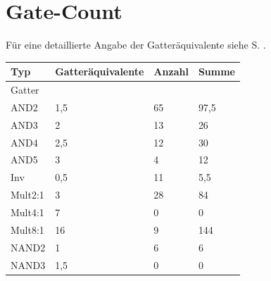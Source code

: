 \documentclass[11pt]{report}
\begin{document}
	\section{Gate-Count}
	Für eine detaillierte Angabe der Gatteräquivalente siehe S. \pageref{gatecounttable}.
	\begin{table}[]
		\centering
		\label{gatecounttable}
		\begin{tabular}{llll}
			\hline
			Typ                                          & Gatteräquivalente          & Anzahl                  & Summe                      \\ \hline\hline
			\multicolumn{1}{|l}{Gatter}                  &                            &                         & \multicolumn{1}{l|}{}      \\ \hline
			\multicolumn{1}{|l|}{AND2}                   & \multicolumn{1}{l|}{1,5}   & \multicolumn{1}{l|}{65} & \multicolumn{1}{l|}{97,5}  \\ \hline
			\multicolumn{1}{|l|}{AND3}                   & \multicolumn{1}{l|}{2}     & \multicolumn{1}{l|}{13} & \multicolumn{1}{l|}{26}    \\ \hline
			\multicolumn{1}{|l|}{AND4}                   & \multicolumn{1}{l|}{2,5}   & \multicolumn{1}{l|}{12} & \multicolumn{1}{l|}{30}    \\ \hline
			\multicolumn{1}{|l|}{AND5}                   & \multicolumn{1}{l|}{3}     & \multicolumn{1}{l|}{4}  & \multicolumn{1}{l|}{12}    \\ \hline
			\multicolumn{1}{|l|}{Inv}                    & \multicolumn{1}{l|}{0,5}   & \multicolumn{1}{l|}{11} & \multicolumn{1}{l|}{5,5}   \\ \hline
			\multicolumn{1}{|l|}{Mult2:1}                & \multicolumn{1}{l|}{3}     & \multicolumn{1}{l|}{28} & \multicolumn{1}{l|}{84}    \\ \hline
			\multicolumn{1}{|l|}{Mult4:1}                & \multicolumn{1}{l|}{7}     & \multicolumn{1}{l|}{0}  & \multicolumn{1}{l|}{0}     \\ \hline
			\multicolumn{1}{|l|}{Mult8:1}                & \multicolumn{1}{l|}{16}    & \multicolumn{1}{l|}{9}  & \multicolumn{1}{l|}{144}   \\ \hline
			\multicolumn{1}{|l|}{NAND2}                  & \multicolumn{1}{l|}{1}     & \multicolumn{1}{l|}{6}  & \multicolumn{1}{l|}{6}     \\ \hline
			\multicolumn{1}{|l|}{NAND3}                  & \multicolumn{1}{l|}{1,5}   & \multicolumn{1}{l|}{0}  & \multicolumn{1}{l|}{0}     \\ \hline

\end{tabular}
\end{table}
\end{document}
